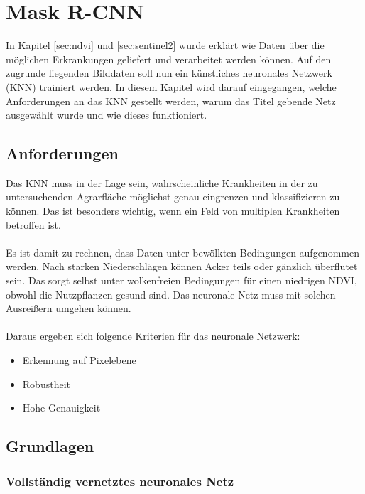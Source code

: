 \section{Mask R-CNN}\label{sec:maskrcnn}
In Kapitel \ref{sec:ndvi} und \ref{sec:sentinel2} wurde erklärt wie Daten über die möglichen Erkrankungen geliefert und verarbeitet werden können. Auf den zugrunde liegenden Bilddaten soll nun ein künstliches neuronales Netzwerk (KNN) trainiert werden. In diesem Kapitel wird darauf eingegangen, welche Anforderungen an das KNN gestellt werden, warum das Titel gebende Netz ausgewählt wurde und wie dieses funktioniert.

\subsection{Anforderungen}\label{sec:sub:requirements}
Das KNN muss in der Lage sein, wahrscheinliche Krankheiten in der zu untersuchenden Agrarfläche möglichst genau eingrenzen und klassifizieren zu können. Das ist besonders wichtig, wenn ein Feld von multiplen Krankheiten betroffen ist.\\\\
Es ist damit zu rechnen, dass Daten unter bewölkten Bedingungen aufgenommen werden. Nach starken Niederschlägen können Acker teils oder gänzlich überflutet sein.\cite{ref:root-rot} Das sorgt selbst unter wolkenfreien Bedingungen für einen niedrigen NDVI, obwohl die Nutzpflanzen gesund sind. Das neuronale Netz muss mit solchen \glqq Ausreißern\grqq{} umgehen können.
\\\\
Daraus ergeben sich folgende Kriterien für das neuronale Netzwerk:

\begin{itemize}
	\item Erkennung auf Pixelebene
	\item Robustheit
	\item Hohe Genauigkeit 
\end{itemize}

\subsection{Grundlagen}\label{sec:sub:basics}

\subsubsection{Vollständig vernetztes neuronales Netz}

